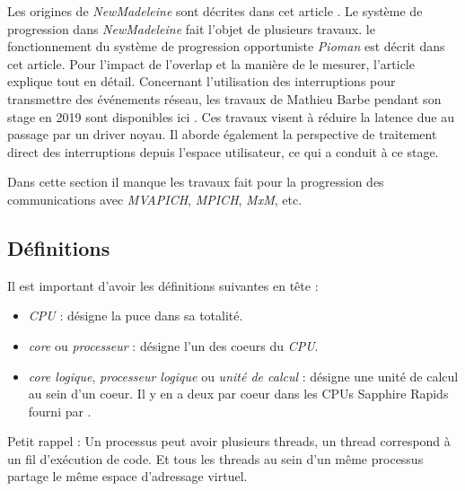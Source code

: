 Les origines de \emph{NewMadeleine} sont décrites dans cet article \cite{aumage:inria-00127356}.
Le système de progression dans \emph{NewMadeleine} fait l'objet de plusieurs travaux.
le fonctionnement du système de progression opportuniste \emph{Pioman} est décrit dans cet article\cite{denis:hal-01087775}.
Pour l'impact de l'overlap et la manière de le mesurer, l'article \cite{denis:hal-01324179} explique tout en détail.
Concernant l'utilisation des interruptions pour transmettre des événements réseau, les travaux de Mathieu Barbe pendant son stage en 2019 sont disponibles ici \cite{internshipMathieu}.
Ces travaux visent à réduire la latence due au passage par un driver noyau.
Il aborde également la perspective de traitement direct des interruptions depuis l'espace utilisateur, ce qui a conduit à ce stage.

Dans cette section il manque les travaux fait pour la progression des communications avec \emph{MVAPICH}, \emph{MPICH}, \emph{MxM}, etc.

\subsection{Définitions}

Il est important d'avoir les définitions suivantes en tête :
\begin{itemize}
  \item \emph{CPU} : désigne la puce dans sa totalité.
  \item \emph{core} ou \emph{processeur} : désigne l'un des coeurs du \emph{CPU}.
  \item \emph{core logique}, \emph{processeur logique} ou \emph{unité de calcul} : %
  désigne une unité de calcul au sein d'un coeur. Il y en a deux par coeur dans les CPUs \intel{} Sapphire Rapids fourni par \atos{}.
\end{itemize}

Petit rappel : Un processus peut avoir plusieurs threads, un thread correspond à un fil d'exécution de code.
Et tous les threads au sein d'un même processus partage le même espace d'adressage virtuel.
